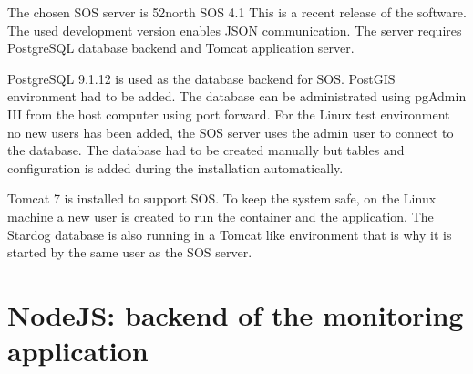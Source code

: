 The chosen SOS server is 52north SOS 4.1 This is a recent release of the software. The used development version enables JSON communication. The server requires PostgreSQL database backend and Tomcat application server.

PostgreSQL 9.1.12 is used as the database backend for SOS. PostGIS environment had to be added. The database can be administrated using pgAdmin III from the host computer using port forward. For the Linux test environment no new users has been added, the SOS server uses the admin user to connect to the database. The database had to be created manually but tables and configuration is added during the installation automatically.

Tomcat 7 is installed to support SOS. To keep the system safe, on the Linux machine a new user is created to run the container and the application. The Stardog database is also running in a Tomcat like environment that is why it is started by the same user as the SOS server. 

\section{NodeJS: backend of the monitoring application}

